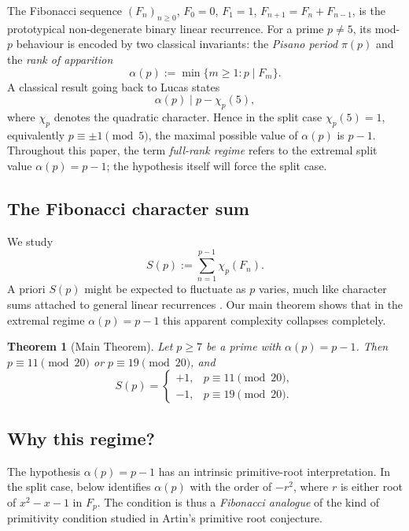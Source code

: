 \documentclass[preprint,5p,times,twocolumn]{elsarticle}
\def\F{F}\def\Z{Z}\def\Q{Q}\def\R{R}\def\N{N}%
\newtheorem{theorem}{Theorem}[section]
\newcommand{\Z}{\mathbb{Z}}
\newcommand{\Q}{\mathbb{Q}}
\newcommand{\R}{\mathbb{R}}
\newcommand{\F}{\mathbb{F}}
\newcommand{\N}{\mathbb{N}}
\begin{document}
The Fibonacci sequence $(F_n)_{n\ge 0}$, $F_0=0$, $F_1=1$, 
$F_{n+1}=F_n+F_{n-1}$, is the prototypical non-degenerate 
binary linear recurrence. For a prime $p\ne 5$, its mod-$p$ 
behaviour is encoded by two classical invariants: the 
\emph{Pisano period} $\pi(p)$ and the \emph{rank of apparition}
\[
\alpha(p):=\min\{m\ge 1:p\mid F_m\}.
\]
A classical result going back to Lucas \cite{Lucas1878} states
\begin{equation}\label{eq:rank-divides}
\alpha(p)\mid p-\chi_p(5),
\end{equation}
where $\chi_p$ denotes the quadratic character. Hence in the 
split case $\chi_p(5)=1$, equivalently $p\equiv\pm 1\pmod 5$, 
the maximal possible value of $\alpha(p)$ is $p-1$.
Throughout this paper, the term \emph{full-rank regime} refers to the
extremal split value $\alpha(p)=p-1$; the hypothesis itself will
force the split case.

\subsection{The Fibonacci character sum}

We study
\[
S(p):=\sum_{n=1}^{p-1}\chi_p(F_n).
\]
A priori $S(p)$ might be expected to fluctuate as $p$ varies, 
much like character sums attached to general linear recurrences 
\cite{Williams1982,Sun1992,Sun2003}. Our main theorem shows that 
in the extremal regime $\alpha(p)=p-1$ this apparent complexity 
collapses completely.

\begin{theorem}[Main Theorem]\label{thm:main}
Let $p\ge 7$ be a prime with $\alpha(p)=p-1$. Then 
$p\equiv 11\pmod{20}$ or $p\equiv 19\pmod{20}$, and
\[
S(p)=
\begin{cases}+1,& p\equiv 11\pmod{20},\\
              -1,& p\equiv 19\pmod{20}.\end{cases}
\]
\end{theorem}

\subsection{Why this regime?}

The hypothesis $\alpha(p)=p-1$ has an intrinsic primitive-root 
interpretation. In the split case,  below 
identifies $\alpha(p)$ with the order of $-r^2$, where $r$ is 
either root of $x^2-x-1$ in $\F_p$. The condition is thus a 
\emph{Fibonacci analogue} of the kind of primitivity condition 
studied in Artin's primitive root conjecture.
\end{document}
